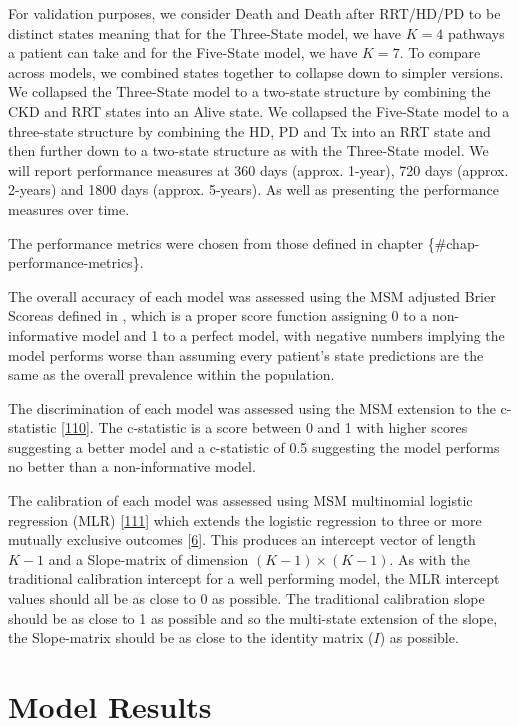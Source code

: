 \documentclass[12pt,PhD,twoside,openright]{muthesis}
\begin{document}
For validation purposes, we consider Death and Death after RRT/HD/PD to be distinct states meaning that for the Three-State model, we have \(K=4\) pathways a patient can take and for the Five-State model, we have \(K=7\). To compare across models, we combined states together to collapse down to simpler versions. We collapsed the Three-State model to a two-state structure by combining the CKD and RRT states into an Alive state. We collapsed the Five-State model to a three-state structure by combining the HD, PD and Tx into an RRT state and then further down to a two-state structure as with the Three-State model. We will report performance measures at 360 days (approx. 1-year), 720 days (approx. 2-years) and 1800 days (approx. 5-years). As well as presenting the performance measures over time.

The performance metrics were chosen from those defined in chapter \{\#chap-performance-metrics\}.

The overall accuracy of each model was assessed using the MSM adjusted Brier Scoreas defined in , which is a proper score function assigning 0 to a non-informative model and 1 to a perfect model, with negative numbers implying the model performs worse than assuming every patient's state predictions are the same as the overall prevalence within the population.

The discrimination of each model was assessed using the MSM extension to the c-statistic {[}\protect\hyperlink{ref-calster_extending_2012-1}{110}{]}. The c-statistic is a score between 0 and 1 with higher scores suggesting a better model and a c-statistic of 0.5 suggesting the model performs no better than a non-informative model.

The calibration of each model was assessed using MSM multinomial logistic regression (MLR) {[}\protect\hyperlink{ref-hoorde_assessing_2014}{111}{]} which extends the logistic regression to three or more mutually exclusive outcomes {[}\protect\hyperlink{ref-riley_prognosis_2019}{6}{]}. This produces an intercept vector of length \(K-1\) and a Slope-matrix of dimension \((K-1) \times (K-1)\). As with the traditional calibration intercept for a well performing model, the MLR intercept values should all be as close to 0 as possible. The traditional calibration slope should be as close to 1 as possible and so the multi-state extension of the slope, the Slope-matrix should be as close to the identity matrix (\(I\)) as possible.

\hypertarget{model-results}{%
\section{Model Results}\label{model-results}}
\end{document}
